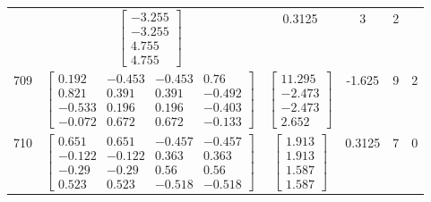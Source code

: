 \documentclass[a4paper,12pt]{article}
\begin{document}
\begin{tabular}{c c c c c c}
&
$\begin{bmatrix} -3.255 \\ -3.255 \\ 4.755 \\ 4.755 \end{bmatrix}$
&
0.3125
&
3
&
2
\\
709
&
$\begin{bmatrix} 0.192 & -0.453 & -0.453 & 0.76 \\ 0.821 & 0.391 & 0.391 & -0.492 \\ -0.533 & 0.196 & 0.196 & -0.403 \\ -0.072 & 0.672 & 0.672 & -0.133 \end{bmatrix}$
&
$\begin{bmatrix} 11.295 \\ -2.473 \\ -2.473 \\ 2.652 \end{bmatrix}$
&
-1.625
&
9
&
2
\\
710
&
$\begin{bmatrix} 0.651 & 0.651 & -0.457 & -0.457 \\ -0.122 & -0.122 & 0.363 & 0.363 \\ -0.29 & -0.29 & 0.56 & 0.56 \\ 0.523 & 0.523 & -0.518 & -0.518 \end{bmatrix}$
&
$\begin{bmatrix} 1.913 \\ 1.913 \\ 1.587 \\ 1.587 \end{bmatrix}$
&
0.3125
&
7
&
0
\\
\end{tabular} \egroup \newpage
\end{document}
